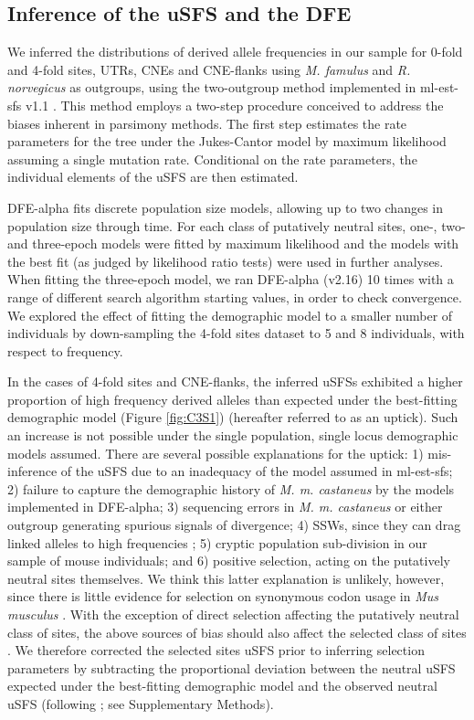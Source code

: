 \subsection{Inference of the uSFS and the DFE}
 
	We inferred the distributions of derived allele frequencies in our sample for 0-fold and 4-fold sites, UTRs, CNEs and CNE-flanks using \textit{M. famulus} and \textit{R. norvegicus} as outgroups, using the two-outgroup method implemented in ml-est-sfs v1.1 \citep{RN321}. This method employs a two-step procedure conceived to address the biases inherent in parsimony methods. The first step estimates the rate parameters for the tree under the Jukes-Cantor model by maximum likelihood assuming a single mutation rate. Conditional on the rate parameters, the individual elements of the uSFS are then estimated.
 
	DFE-alpha fits discrete population size models, allowing up to two changes in population size through time. For each class of putatively neutral sites, one-, two- and three-epoch models were fitted by maximum likelihood and the models with the best fit (as judged by likelihood ratio tests) were used in further analyses. When fitting the three-epoch model, we ran DFE-alpha (v2.16) 10 times with a range of different search algorithm starting values, in order to check convergence. We explored the effect of fitting the demographic model to a smaller number of individuals by down-sampling the 4-fold sites dataset to 5 and 8 individuals, with respect to frequency.

	In the cases of 4-fold sites and CNE-flanks, the inferred uSFSs exhibited a higher proportion of high frequency derived alleles than expected under the best-fitting demographic model (Figure \ref{fig:C3S1}) (hereafter referred to as an uptick). Such an increase is not possible under the single population, single locus demographic models assumed. There are several possible explanations for the uptick: 1) mis-inference of the uSFS due to an inadequacy of the model assumed in ml-est-sfs; 2) failure to capture the demographic history of \textit{M. m. castaneus} by the models implemented in DFE-alpha; 3) sequencing errors in \textit{M. m. castaneus} or either outgroup generating spurious signals of divergence; 4) SSWs, since they can drag linked alleles to high frequencies \citep{RN287,RN343}; 5) cryptic population sub-division in our sample of mouse individuals; and 6) positive selection, acting on the putatively neutral sites themselves. We think this latter explanation is unlikely, however, since there is little evidence for selection on synonymous codon usage in \textit{Mus musculus} \citep{RN195}. With the exception of direct selection affecting the putatively neutral class of sites, the above sources of bias should also affect the selected class of sites \citep{RN275, RN276, RN321}. We therefore corrected the selected sites uSFS prior to inferring selection parameters by subtracting the proportional deviation between the neutral uSFS expected under the best-fitting demographic model and the observed neutral uSFS (following \citealt{RN321}; see Supplementary Methods). 
 

